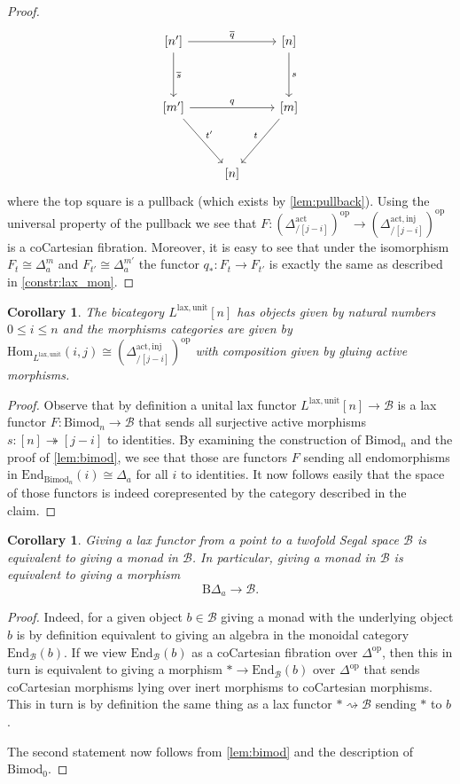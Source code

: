 \documentclass[a4paper, reqno]{amsart}
\newtheorem{cor}[theorem]{Corollary}
\theoremstyle{definition}
\newcommand\cB{\mathscr B}
\newcommand\rB{\mathrm B}
\newcommand\edm{\mathrm{End}}
\newcommand\mor{\mathrm{Hom}}
\newcommand\inj{\mathrm{inj}}
\newcommand\op{\mathrm{op}}
\newcommand\lax{\mathrm{lax}}
\newcommand\un{\mathrm{unit}}
\newcommand\bimod{\mathrm{Bimod}}
\newcommand\act{\mathrm{act}}
\begin{document}
\begin{proof}
\[
\begin{tikzcd}[row sep=huge]
{[n']}\arrow[d, "\overline{s}"]\arrow[rr,"\overline{q}"]&{}&{[n]}\arrow[d, "s"]\\
{[m']}\arrow[rr,"q"]\arrow[dr,"t'"]&{}&{[m]}\arrow[dl, "t" swap]\\
{}&{[n]}
\end{tikzcd}
\]
where the top square is a pullback (which exists by \cref{lem:pullback}). Using the universal property of the pullback we see that $F:(\Delta^\act_{/[j-i]})^\op\rightarrow(\Delta^{\act,\inj}_{/[j-i]})^\op$ is a coCartesian fibration. Moreover, it is easy to see that under the isomorphism $F_t\cong \Delta^m_a$ and $F_{t'}\cong \Delta^{m'}_a$ the functor $q_*:F_t\rightarrow F_{t'}$ is exactly the same as described in \cref{constr:lax_mon}.
\end{proof}
\begin{cor}\label{cor:uni}
The bicategory $L^{\lax,\un}[n]$ has objects given by natural numbers $0\leq i\leq n$ and the morphisms categories are given by $\mor_{L^{\lax,\un}}(i,j)\cong(\Delta^{\act,\inj}_{/[j-i]})^\op$ with composition given by gluing active morphisms.
\end{cor}
\begin{proof}
Observe that by definition a unital lax functor $L^{\lax,\un}[n]\rightarrow\cB$ is a lax functor $F:\bimod_n\rightarrow\cB$ that sends all surjective active morphisms $s:[n]\twoheadrightarrow[j-i]$ to identities. By examining the construction of $\bimod_n$ and the proof of \cref{lem:bimod}, we see that those are functors $F$ sending all endomorphisms in $\edm_{\bimod_n}(i)\cong\Delta_a$ for all $i$ to identities. It now follows easily that the space of those functors is indeed corepresented by the category described in the claim.
\end{proof}
\begin{cor}\label{cor:lax_mon}
Giving a lax functor from a point to a twofold Segal space $\cB$ is equivalent to giving a monad in $\cB$. In particular, giving a monad in $\cB$ is equivalent to giving a morphism \[\rB\Delta_a\rightarrow\cB.\]
\end{cor}
\begin{proof}
Indeed, for a given object $b\in\cB$ giving a monad with the underlying object $b$ is by definition equivalent to giving an algebra in the monoidal category $\edm_\cB(b)$. If we view $\edm_\cB(b)$ as a coCartesian fibration over $\Delta^\op$, then this in turn is equivalent to giving a morphism $*\rightarrow\edm_\cB(b)$ over $\Delta^\op$ that sends coCartesian morphisms lying over inert morphisms to coCartesian morphisms. This in turn is by definition the same thing as a lax functor $*\rightsquigarrow\cB$ sending $*$ to $b$.\par
The second statement now follows from \cref{lem:bimod} and the description of $\bimod_0$.
\end{proof}
\end{document}
